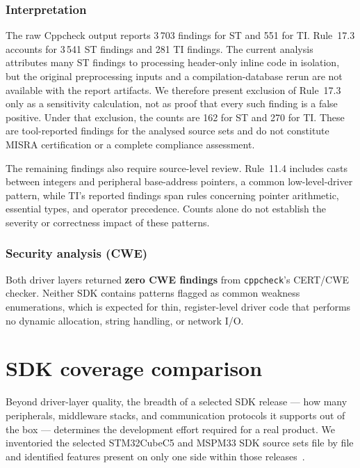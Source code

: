 \subsubsection*{Interpretation}
The raw Cppcheck output reports 3\,703 findings for ST and 551 for TI. Rule~17.3 accounts
for 3\,541 ST findings and 281 TI findings. The current analysis attributes many ST
findings to processing header-only inline code in isolation, but the original preprocessing
inputs and a compilation-database rerun are not available with the report artifacts. We
therefore present exclusion of Rule~17.3 only as a sensitivity calculation, not as proof
that every such finding is a false positive. Under that exclusion, the counts are 162 for
ST and 270 for TI. These are tool-reported findings for the analysed source sets and do not
constitute MISRA certification or a complete compliance assessment.

The remaining findings also require source-level review. Rule~11.4 includes casts between
integers and peripheral base-address pointers, a common low-level-driver pattern, while TI's
reported findings span rules concerning pointer arithmetic, essential types, and operator
precedence. Counts alone do not establish the severity or correctness impact of these
patterns.

\subsubsection*{Security analysis (CWE)}
Both driver layers returned \textbf{zero CWE findings} from \texttt{cppcheck}'s CERT/CWE
checker. Neither SDK contains patterns flagged as common weakness enumerations, which is
expected for thin, register-level driver code that performs no dynamic allocation, string
handling, or network I/O.

\section{SDK coverage comparison}
\label{sec:ti-sdk-coverage}

Beyond driver-layer quality, the breadth of a selected SDK release --- how many peripherals, middleware
stacks, and communication protocols it supports out of the box --- determines the
development effort required for a real product. We inventoried the selected STM32CubeC5
and MSPM33 SDK source sets file by file and identified features present on only one side
within those releases~\cite{stm32cubec5-sw,ti-mspm33-sdk}.

